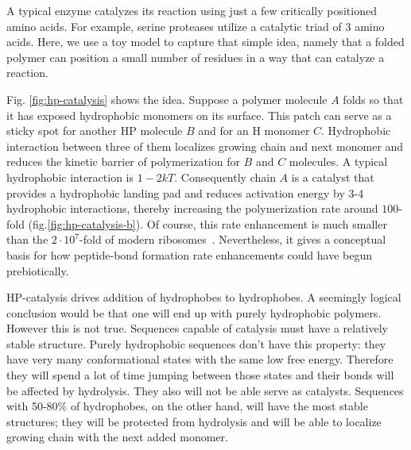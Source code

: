 \documentclass[journal=jacsat,manuscript=article,layout=twocolumn]{achemso}
\begin{document}
A typical enzyme catalyzes its reaction using just a few 
critically positioned amino acids.  For example, serine proteases utilize a catalytic triad of 3 
amino acids.  Here, we use a toy model to capture that simple idea, namely that a folded 
polymer can position a small number of residues in a way that can catalyze a reaction.  

Fig. \ref{fig:hp-catalysis} shows the idea.  Suppose a polymer molecule $A$ folds so that it has 
exposed hydrophobic monomers on its surface.  This patch can serve as a sticky 
spot for another HP molecule $B$ and for an H monomer $C$.  Hydrophobic interaction between three of
them localizes growing chain and next monomer and reduces the kinetic barrier of polymerization 
for $B$ and $C$ molecules.  A typical hydrophobic 
interaction is $1-2kT$.  Consequently chain $A$ is a catalyst that provides a 
hydrophobic landing pad and reduces activation energy by 3-4 hydrophobic interactions, thereby 
increasing the polymerization rate around $ 100$-fold (fig.\ref{fig:hp-catalysis-b}). 
 Of course, this rate enhancement is much smaller than the $2\cdot10^7$-fold of modern 
ribosomes~\cite{Sievers2004a}. Nevertheless, it gives a conceptual basis for how peptide-bond 
formation rate enhancements could have begun prebiotically.

HP-catalysis drives addition of hydrophobes
to hydrophobes. A seemingly logical conclusion
would be that one will end up with purely hydrophobic polymers. However this is not true.
Sequences capable of catalysis must have a relatively stable structure. Purely hydrophobic
sequences don't have this property: they have
very many conformational states with the same
low free energy. Therefore they will spend a lot
of time jumping between those states and their
bonds will be affected by hydrolysis. They also
will not be able serve as catalysts. Sequences
with 50-80\% of hydrophobes, on the other
hand, will have the most stable structures; they
will be protected from hydrolysis and will be
able to localize growing chain with the next added monomer.
\end{document}
